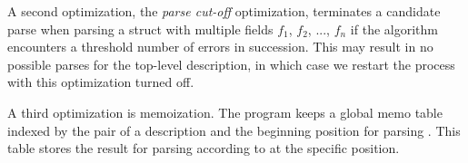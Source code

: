 A second optimization, the {\em parse cut-off} optimization, terminates a
candidate parse when parsing a struct with multiple
fields $f_1$, $f_2$, ..., $f_n$ if the algorithm encounters 
a threshold number of errors in succession. 
This may result in no possible parses for the
top-level description, in which case we restart the process
with this optimization turned off. 

A third optimization is memoization.
The program keeps a global memo table indexed by the pair of a
description  and the beginning position for parsing .  This table
stores the result for parsing according to  at the specific position.


